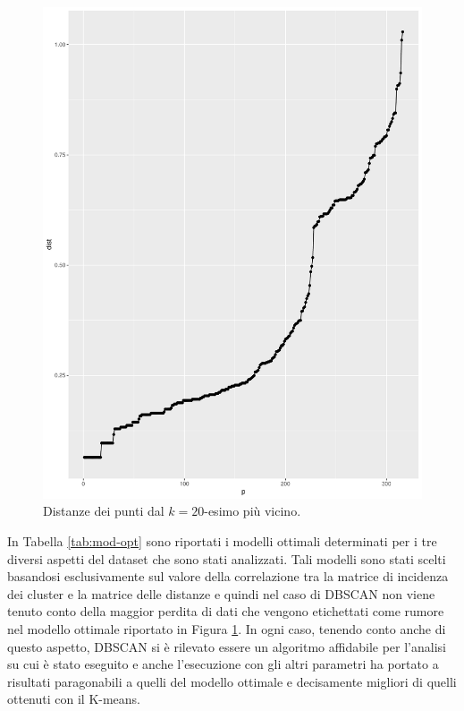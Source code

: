 \documentclass[12pt]{article}
\begin{document}
\begin{figure}[H]
\centering
	\includegraphics[width=\textwidth]{img/eps-minpts20.pdf}
	\caption{Distanze dei punti dal $k=20$-esimo più vicino.}
	\label{fig:eps-minpts20}
\end{figure}

In Tabella \ref{tab:mod-opt} sono riportati i modelli ottimali determinati per i tre diver\-si aspetti del dataset che sono stati analizzati. 
Tali modelli sono stati scelti basandosi esclusivamente sul valore della correlazione tra la matrice di incidenza dei cluster e la matrice delle distanze e quindi nel caso di DBSCAN non viene tenuto conto della maggior perdita di dati che vengono etichet\-tati come rumore nel modello ottimale riportato in Figura \ref{fig:eps-minpts20}. 
In ogni caso, tenendo conto anche di questo aspetto, DBSCAN si è rilevato essere un algoritmo affidabile per l'analisi su cui è stato eseguito e anche l'esecu\-zione con gli altri parametri ha portato a risultati paragonabili a quelli del modello ottimale e decisamente migliori di quelli ottenuti con il K-means.
\end{document}
